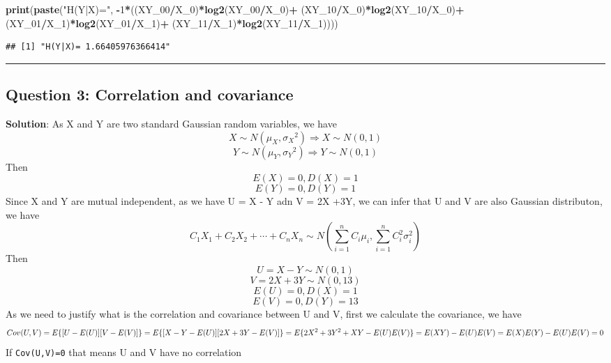 \documentclass[]{article}
\newenvironment{Shaded}{\begin{snugshade}}{\end{snugshade}}
\newcommand{\KeywordTok}[1]{\textcolor[rgb]{0.13,0.29,0.53}{\textbf{#1}}}
\newcommand{\DecValTok}[1]{\textcolor[rgb]{0.00,0.00,0.81}{#1}}
\newcommand{\StringTok}[1]{\textcolor[rgb]{0.31,0.60,0.02}{#1}}
\newcommand{\OperatorTok}[1]{\textcolor[rgb]{0.81,0.36,0.00}{\textbf{#1}}}
\newcommand{\NormalTok}[1]{#1}
\begin{document}
\begin{Shaded}
\begin{Highlighting}[]
\KeywordTok{print}\NormalTok{(}\KeywordTok{paste}\NormalTok{(}\StringTok{"H(Y|X)="}\NormalTok{, }
            \OperatorTok{-}\DecValTok{1}\OperatorTok{*}\NormalTok{((XY_}\DecValTok{00}\OperatorTok{/}\NormalTok{X_}\DecValTok{0}\NormalTok{)}\OperatorTok{*}\KeywordTok{log2}\NormalTok{(XY_}\DecValTok{00}\OperatorTok{/}\NormalTok{X_}\DecValTok{0}\NormalTok{)}\OperatorTok{+}
\StringTok{            }\NormalTok{(XY_}\DecValTok{10}\OperatorTok{/}\NormalTok{X_}\DecValTok{0}\NormalTok{)}\OperatorTok{*}\KeywordTok{log2}\NormalTok{(XY_}\DecValTok{10}\OperatorTok{/}\NormalTok{X_}\DecValTok{0}\NormalTok{)}\OperatorTok{+}
\StringTok{            }\NormalTok{(XY_}\DecValTok{01}\OperatorTok{/}\NormalTok{X_}\DecValTok{1}\NormalTok{)}\OperatorTok{*}\KeywordTok{log2}\NormalTok{(XY_}\DecValTok{01}\OperatorTok{/}\NormalTok{X_}\DecValTok{1}\NormalTok{)}\OperatorTok{+}
\StringTok{            }\NormalTok{(XY_}\DecValTok{11}\OperatorTok{/}\NormalTok{X_}\DecValTok{1}\NormalTok{)}\OperatorTok{*}\KeywordTok{log2}\NormalTok{(XY_}\DecValTok{11}\OperatorTok{/}\NormalTok{X_}\DecValTok{1}\NormalTok{))))}
\end{Highlighting}
\end{Shaded}

\begin{verbatim}
## [1] "H(Y|X)= 1.66405976366414"
\end{verbatim}

\begin{center}\rule{0.5\linewidth}{\linethickness}\end{center}

\subsection{Question 3: Correlation and
covariance}\label{question-3-correlation-and-covariance}

\textbf{Solution}: As X and Y are two standard Gaussian random
variables, we have
\[ X\sim N(\mu_{X} ,{ \sigma_{X}  }^{ 2 })\Rightarrow X\sim N(0,1)\]
\[ Y\sim N(\mu_{Y} ,{ \sigma_{Y}  }^{ 2 })\Rightarrow Y\sim N(0,1)\]
Then \[ E(X)=0, D(X)=1 \] \[ E(Y)=0, D(Y)=1 \] Since X and Y are mutual
independent, as we have U = X - Y adn V = 2X +3Y, we can infer that U
and V are also Gaussian distributon, we have
\[ { C }_{ 1 }{ X }_{ 1 }+{ C }_{ 2 }{ X }_{ 2 }+\cdots +{ C }_{ n }{ X }_{ n }\sim N(\sum _{ i=1 }^{ n }{ { C }_{ i }\mu _{ i } } ,\sum _{ i=1 }^{ n }{ { C }_{ i }^{ 2 }{ \sigma  }_{ i }^{ 2 } } ) \]
Then \[ U=X-Y\sim N(0,1) \] \[ V=2X+3Y\sim N(0,13) \]
\[ E(U)=0, D(X)=1 \] \[ E(V)=0, D(Y)=13 \] As we need to justify what is
the correlation and covariance between U and V, first we calculate the
covariance, we have
\[ Cov(U,V)=E\{ [U-E(U)][V-E(V)]\} \\ =E\{ [X-Y-E(U)][2X+3Y-E(V)]\} \\ =E\{ 2{ X }^{ 2 }+3{ Y }^{ 2 }+XY-E(U)E(V)\} \\ =E(XY)-E(U)E(V)\\ =E(X)E(Y)-E(U)E(V)=0 \]
If \texttt{Cov(U,V)=0} that means U and V have no correlation
\end{document}
